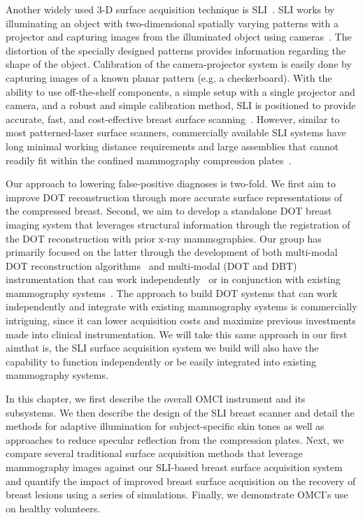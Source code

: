 Another widely used 3-D surface acquisition technique is \ac{SLI}~\cite{Yang2020, Zhang2018}. \ac{SLI} works by illuminating an object with two-dimensional spatially varying patterns with a projector and capturing images from the illuminated object using cameras~\cite{Geng2011}. The distortion of the specially designed patterns provides information regarding the shape of the object. Calibration of the camera-projector system is easily done by capturing images of a known planar pattern (e.g. a checkerboard). With the ability to use off-the-shelf components, a simple setup with a single projector and camera, and a robust and simple calibration method, \ac{SLI} is positioned to provide accurate, fast, and cost-effective breast surface scanning~\cite{Yang2020}. However, similar to most patterned-laser surface scanners, commercially available \ac{SLI} systems have long minimal working distance requirements and large assemblies that cannot readily fit within the confined mammography compression plates~\cite{Zhang2018, Rodriguez2017}.

Our approach to lowering false-positive diagnoses is two-fold. We first aim to improve \ac{DOT} reconstruction through more accurate surface representations of the compressed breast. Second, we aim to develop a standalone \ac{DOT} breast imaging system that leverages structural information through the registration of the \ac{DOT} reconstruction with prior x-ray mammographies. Our group has primarily focused on the latter through the development of both multi-modal \ac{DOT} reconstruction algorithms~\cite{Deng2015} and multi-modal (\ac{DOT} and \ac{DBT}) instrumentation that can work independently~\cite{Carp2006,Carp2008,Carp2013} or in conjunction with existing mammography systems~\cite{Fang2009,Zimmermann2017}. The approach to build \ac{DOT} systems that can work independently and integrate with existing mammography systems is commercially intriguing, since it can lower acquisition costs and maximize previous investments made into clinical instrumentation. We will take this same approach in our first aim\textemdash that is, the \ac{SLI} surface acquisition system we build will also have the capability to function independently or be easily integrated into existing mammography systems. 

In this chapter, we first describe the overall \ac{OMCI} instrument and its subsystems. We then describe the design of the \ac{SLI} breast scanner and detail the methods for adaptive illumination for subject-specific skin tones as well as approaches to reduce specular reflection from the compression plates. Next, we compare several traditional surface acquisition methods that leverage mammography images against our \ac{SLI}-based breast surface acquisition system and quantify the impact of improved breast surface acquisition on the recovery of breast lesions using a series of simulations. Finally, we demonstrate \ac{OMCI}'s use on healthy volunteers.



